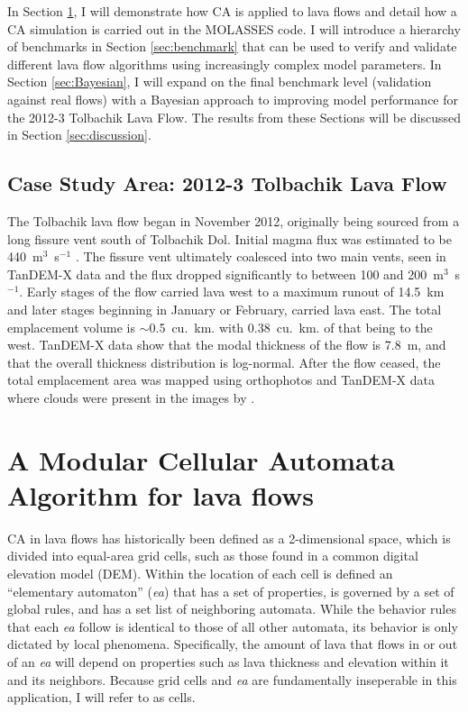 \documentclass[12pt,letter]{article}
\begin{document}
	In Section \ref{sec:MOLASSES}, I will demonstrate how CA is applied to lava flows and detail how a CA simulation is carried out in the MOLASSES code. I will introduce a hierarchy of benchmarks in Section \ref{sec:benchmark} that can be used to verify and validate different lava flow algorithms using increasingly complex model parameters. In Section \ref{sec:Bayesian}, I will expand on the final benchmark level (validation against real flows) with a Bayesian approach to improving model performance for the 2012-3 Tolbachik Lava Flow. The results from these Sections will be discussed in Section \ref{sec:discussion}.
	
	\subsection{Case Study Area: 2012-3 Tolbachik Lava Flow}\label{sec:tolb_back}
The Tolbachik lava flow began in November 2012, originally being sourced from a long fissure vent south of Tolbachik Dol. Initial magma flux was estimated to be 440~m$^3$~s$^{-1}$ \citep{belousov2015overview}. The fissure vent ultimately coalesced into two main vents, seen in TanDEM-X data and the flux dropped significantly to between 100 and 200~m$^3$~s$^{-1}$. Early stages of the flow carried lava west to a maximum runout of 14.5~km and later stages beginning in January or February, carried lava east. The total emplacement volume is $\sim$0.5~cu.~km. with 0.38~cu.~km. of that being to the west. TanDEM-X data show that the modal thickness of the flow is 7.8~m, and that the overall thickness distribution is log-normal. After the flow ceased, the total emplacement area was mapped using orthophotos and TanDEM-X data where clouds were present in the images by \citet{kubanek2015lava}.
	


\section{A Modular Cellular Automata Algorithm for lava flows}\label{sec:MOLASSES}

CA in lava flows has historically been defined as a 2-dimensional space, which is divided into equal-area grid cells, such as those found in a common digital elevation model (DEM). Within the location of each cell is defined an ``elementary automaton'' (\textit{ea}) that has a set of properties, is governed by a set of global rules, and has a set list of neighboring automata. While the behavior rules that each \textit{ea} follow is identical to those of all other automata, its behavior is only dictated by local phenomena. Specifically, the amount of lava that flows in or out of an \textit{ea} will depend on properties such as lava thickness and elevation within it and its neighbors. Because grid cells and \textit{ea} are fundamentally inseperable in this application, I will refer to  as cells.
\end{document}

